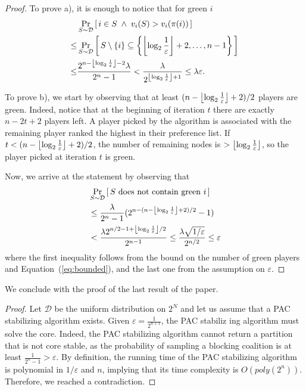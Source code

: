 \documentclass[letterpaper]{article} %
\DeclarePairedDelimiter{\floor}{\lfloor}{\rfloor}
\let\epsilon\varepsilon
\let\eps\varepsilon
\newcommand{\distribution}{\mathcal{D}}
\newcommand{\Prob}[2]{\Pr_{#2}\left[\,#1\,\right]}
\newcommand{\Wthreshold}{\ensuremath{\floor*{\log_2{\frac{1}{\varepsilon}}}}}
\newcommand{\GV}[1]{\textcolor{violet}{{\footnotesize #1}}\marginpar{\raggedright\tiny \textcolor{violet}{Giovanna}}}
\newcommand{\BK}[1]{\textcolor{cyan}{{\footnotesize #1}}\marginpar{\raggedright\tiny \textcolor{cyan}{Bojana}}}
\begin{document}
\greenNodes*
\begin{proof}
To prove a), it is enough to notice that for green $i$ 
\begin{align*}
        &\Prob{i \in S \;\land\; v_i(S)>v_i(\pi(i))}{S \sim \distribution}\\
        \leq &\Prob{S \setminus \{i\} \subseteq \left\{ \Wthreshold+2, \ldots, n-1\right\}}{S \sim \distribution}\\
        \leq &\frac{2^{n-\Wthreshold-2}\lambda}{ 2^n-1} < \frac{\lambda}{2^{\Wthreshold + 1}} \le \lambda\epsilon.
\end{align*}

To prove b), we start by observing that at least $(n-\Wthreshold+2)/2$ players are green. Indeed, notice that at the beginning of iteration $t$ there are exactly $n-2t+2$ players left. A player picked by the algorithm is associated with the remaining player ranked the highest in their preference list. If $t < (n-\Wthreshold+2)/2$, the number of remaining nodes is $>\Wthreshold$, so the player picked at iteration $t$ is green.

Now, we arrive at the statement by observing that
\begin{align*}
    &\Prob{S\text{ does not contain green } i}{S \sim \distribution}\\
    &\leq \frac{\lambda}{2^n-1}(2^{n-(n-\Wthreshold+2)/2} -1) \\
    &< \frac{\lambda 2^{n/2-1 + \Wthreshold/2}}{2^{n-1}}
    \leq \frac{\lambda\sqrt{1/\epsilon}}{2^{n/2}} \leq \eps
\end{align*}
where the first inequality follows from the bound on the number of green players and Equation~(\ref{eq:bounded}), and the last one from the assumption on $\eps$.
\end{proof}

We conclude with the proof of the last result of the paper.

\ComputationalNotStab*
\begin{proof}
Let $\distribution$ be the uniform distribution on $2^N$ and let us assume that a PAC stabilizing algorithm exists. Given $\epsilon = \frac{1}{2^{n+1}}$, the PAC stabiliz ing algorithm must solve the core. Indeed, the PAC stabilizing algorithm cannot return a partition that is not core stable, as the probability of sampling a blocking coalition is at least $\frac{1}{2^{n}-1} > \epsilon$.
By definition, the running time of the PAC stabilizing algorithm is polynomial in $1/\epsilon$  and $n$, implying that its time complexity is $O(poly(2^n))$.
Therefore, we reached a contradiction.
\end{proof}
\end{document}

